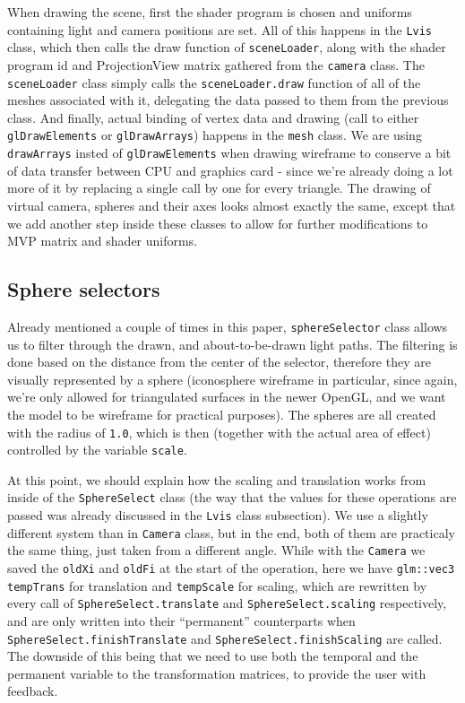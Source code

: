 When drawing the scene, first the shader program is chosen and uniforms containing light and camera positions are set. All of this happens in the \texttt{Lvis} class, which then calls the draw function of \texttt{sceneLoader}, along with the shader program id and ProjectionView matrix gathered from the \texttt{camera} class. The \texttt{sceneLoader} class simply calls the \texttt{sceneLoader.draw} function of all of the meshes associated with it, delegating the data passed to them from the previous class. And finally, actual binding of vertex data and drawing (call to either \texttt{glDrawElements} or \texttt{glDrawArrays}) happens in the \texttt{mesh} class. We are using \texttt{drawArrays} insted of \texttt{glDrawElements} when drawing wireframe to conserve a bit of data transfer between CPU and graphics card - since we're already doing a lot more of it by replacing a single call by one for every triangle. The drawing of virtual camera, spheres and their axes looks almost exactly the same, except that we add another step inside these classes to allow for further modifications to MVP matrix and shader uniforms.

\subsection{Sphere selectors}

Already mentioned a couple of times in this paper, \texttt{sphereSelector} class allows us to filter through the drawn, and about-to-be-drawn light paths. The filtering is done based on the distance from the center of the selector, therefore they are visually represented by a sphere (iconosphere wireframe in particular, since again, we're only allowed for triangulated surfaces in the newer OpenGL, and we want the model to be wireframe for practical purposes). The spheres are all created with the radius of \texttt{1.0}, which is then (together with the actual area of effect) controlled by the variable \texttt{scale}. 

At this point, we should explain how the scaling and translation works from inside of the \texttt{SphereSelect} class (the way that the values for these operations are passed was already discussed in the \texttt{Lvis} class subsection). We use a slightly different system than in \texttt{Camera} class, but in the end, both of them are practicaly the same thing, just taken from a different angle. While with the \texttt{Camera} we saved the \texttt{oldXi} and \texttt{oldFi} at the start of the operation, here we have \texttt{glm::vec3 tempTrans} for translation and \texttt{tempScale} for scaling, which are rewritten by every call of \texttt{SphereSelect.translate} and \texttt{SphereSelect.scaling} respectively, and are only written into their ``permanent''  counterparts when \texttt{SphereSelect.finishTranslate} and \texttt{SphereSelect.finishScaling} are called. The downside of this being that we need to use both the temporal and the permanent variable to the transformation matrices, to provide the user with feedback.

